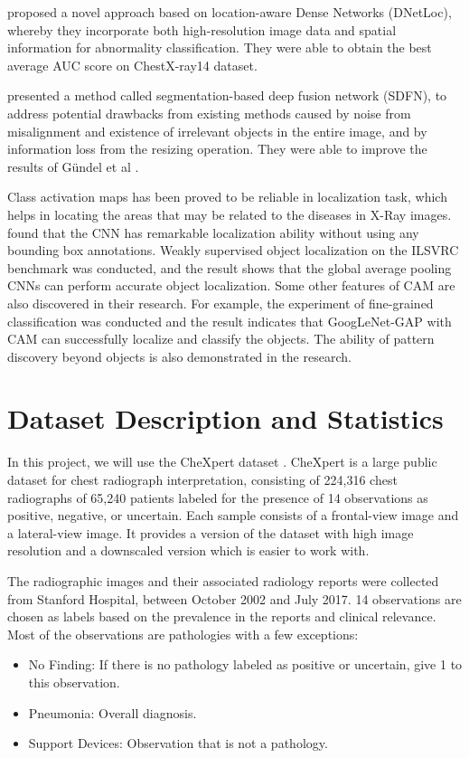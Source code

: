 \documentclass{amia}
\begin{document}
{\color{cyan}\cite{gundel}} proposed a novel approach based on location-aware Dense Networks (DNetLoc), whereby they incorporate both high-resolution image data and spatial information for abnormality classification. They were able to obtain the best average AUC score on ChestX-ray14 dataset.

{\color{cyan}\cite{liu}} presented a method called segmentation-based deep fusion network (SDFN), to address potential drawbacks from existing methods caused by noise from misalignment and existence of irrelevant objects in the entire image, and by information loss from the resizing operation. They were able to improve the results of Gündel et al {\color{cyan}\cite{gundel}}.

Class activation maps has been proved to be reliable in localization task, which helps in locating the areas that may be related to the diseases in X-Ray images. {\color{cyan}\cite{zhou}} found that the CNN has remarkable localization ability without using any bounding box annotations. Weakly supervised object localization on the ILSVRC benchmark was conducted, and the result shows that the global average pooling CNNs can perform accurate object localization. Some other features of CAM are also discovered in their research. For example, the experiment of fine-grained classification was conducted and the result indicates that GoogLeNet-GAP with CAM can successfully localize and classify the objects. The ability of pattern discovery beyond objects is also demonstrated in the research.


\section{Dataset Description and Statistics}

In this project, we will use the CheXpert dataset {\color{cyan}\cite{irvin}}. CheXpert is a large public dataset for chest radiograph interpretation, consisting of 224,316 chest radiographs of 65,240 patients labeled for the presence of 14 observations as positive, negative, or uncertain. Each sample consists of a frontal-view image and a lateral-view image. It provides a version of the dataset with high image resolution and a downscaled version which is easier to work with.

The radiographic images and their associated radiology reports were collected from Stanford Hospital, between October 2002 and July 2017. 14 observations are chosen as labels based on the prevalence in the reports and clinical relevance. Most of the observations are pathologies with a few exceptions:
\begin{itemize}

	\item  No Finding: If there is no pathology labeled as positive or uncertain, give 1 to this observation. 
	\item  Pneumonia: Overall diagnosis.
	\item Support Devices: Observation that is not a pathology.
\end{itemize}
\end{document}
